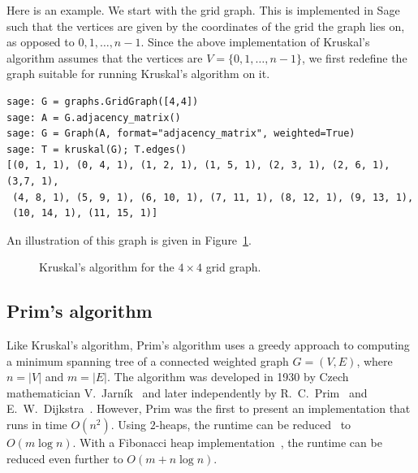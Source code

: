 Here is an example. We start with the grid
graph. This is implemented in Sage such that the vertices are given by
the coordinates of the grid the graph lies on, as opposed to
$0, 1, \dots, n-1$. Since the above implementation of
Kruskal's algorithm assumes that the
vertices are $V = \{0, 1, \dots, n-1\}$, we first redefine the graph
suitable for running Kruskal's algorithm on
it.
\begin{lstlisting}
sage: G = graphs.GridGraph([4,4])
sage: A = G.adjacency_matrix()
sage: G = Graph(A, format="adjacency_matrix", weighted=True)
sage: T = kruskal(G); T.edges()
[(0, 1, 1), (0, 4, 1), (1, 2, 1), (1, 5, 1), (2, 3, 1), (2, 6, 1), (3,7, 1),
 (4, 8, 1), (5, 9, 1), (6, 10, 1), (7, 11, 1), (8, 12, 1), (9, 13, 1),
 (10, 14, 1), (11, 15, 1)]
\end{lstlisting}
An illustration of this graph is given in
Figure~\ref{fig:trees-forests:Kruskal_example}.

\begin{figure}[!htbp]
\centering
{}

\caption{Kruskal's algorithm for the $4 \times 4$ grid graph.}
\label{fig:trees-forests:Kruskal_example}
\end{figure}



\subsection{Prim's algorithm}
\label{subsec:trees_forests:Prim_algorithm}

Like Kruskal's algorithm,
Prim's algorithm uses a
greedy approach to computing a
minimum spanning tree of a connected
weighted graph $G = (V,E)$, where $n = |V|$ and
$m = |E|$. The algorithm was developed in 1930 by Czech mathematician
V.~Jarn\'ik~\cite{Jarnik1930} and later
independently by R.~C.~Prim~\cite{Prim1957} and
E.~W.~Dijkstra~\cite{Dijkstra1959}. However,
Prim was the first to present an implementation
that runs in time $O(n^2)$. Using $2$-heaps, the
runtime can be reduced~\cite{KershenbaumVanSlyke1972} to
$O(m \log n)$. With a Fibonacci heap
implementation~\cite{FredmanTarjan1984,FredmanTarjan1987}, the runtime
can be reduced even further to $O(m + n \log n)$.

